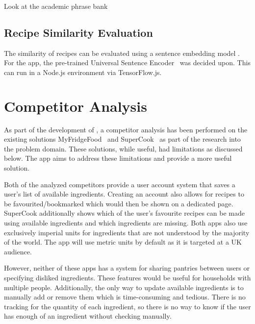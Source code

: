 {    Look at the academic phrase bank
}

\subsection{Recipe Similarity Evaluation}\label{sec:recipe_similarity}
The similarity of recipes can be evaluated using a sentence embedding model . For the \chef{} app,
the pre-trained Universal Sentence Encoder~\cite{cer_universal_2018} was decided upon. This can run in a Node.js
environment via TensorFlow.js.


\section{Competitor Analysis}\label{sec:competitor_analysis}
As part of the development of \chef{}, a competitor analysis has been performed on the existing solutions
MyFridgeFood~\cite{myfridgefood_myfridgefood_nodate} and SuperCook~\cite{supercook_supercook_nodate} as part of the research
into the problem domain. These solutions, while useful, had limitations as discussed below. The \chef{} app aims to address
these limitations and provide a more useful solution.

Both of the analyzed competitors provide a user account system
that saves a user's list of available ingredients. Creating an account also allows for recipes to be favourited/bookmarked
which would then be shown on a dedicated page. SuperCook additionally shows which of the user's favourite recipes
can be made using available ingredients and which ingredients are missing. Both apps also use exclusively imperial
units for ingredients that are not understood by the majority of the world. The \chef{} app will use metric units by default
as it is targeted at a UK audience.

However, neither of these apps has a system for sharing pantries between users or specifying disliked ingredients. These features would be useful for households with multiple people.
Additionally, the only way to update available ingredients is to manually add or remove them which is time-consuming and tedious. There is no tracking for the quantity of
each ingredient, so there is no way to know if the user has enough of an ingredient without checking manually.

